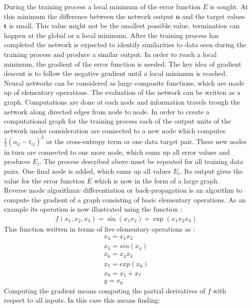 During the training process a local minimum of the error function $E$ is sought. At this minimum the difference between the network output $\mathbf{o}$ and the target values $\mathbf{t}$ is small. This value might not be the smallest possible value, termination can happen at the global or a local minimum. 
After the training process has completed the network is expected to identify similarities to data seen during the training process and produce a similar output. 
In order to reach a local minimum, the gradient of the error function is needed. The key idea of gradient descent is to follow the negative gradient until a local minimum is reached. 
Neural networks can be considered as large composite functions, which are made up of elementary operations. The evaluation of the network can be written as a graph. Computations are done at each node and information travels trough the network along directed edges from node to node. In order to create a computational graph for the training process each of the output units of the network under consideration are connected to a new node which computes $\frac{1}{2}(o_{ij} - t_{ij})^2$\cite[page 157]{Rojas1996} or the cross-entropy term or one data target pair. These new nodes in turn are connected to one more node, which sums up all error values and produces $E_i$. The process described above must be repeated for all training data pairs. One final node is added, which sums up all values $E_i$. Its output gives the value for the error function $E$ which is now in the form of a large graph.\\
Reverse mode algorithmic differentiation or back-propagation is an algorithm to compute the gradient of a graph consisting of basic elementary operations. As an example its operation is now illustrated using the function \cite[page 69]{Diehl2013}:
\begin{align}
f(x_1,x_2,x_3) = \sin(x_1 x_2) + \exp(x_1 x_2 x_3)
\label{eq:backFun}
\end{align}
This function written in terms of five elementary operations as \cite[page 70]{Diehl2013}:
\begin{align}
x_4 = x_1 x_2 \\
x_5 = sin(x_4)\\
x_6 = x_4 x_3 \\
x_7 = exp(x_6) \\
x_8 = x_5 + x_7 \\
y = x_8
\end{align}
Computing the gradient means computing the partial derivatives of $f$ with respect to all inputs. In this case this means finding:
